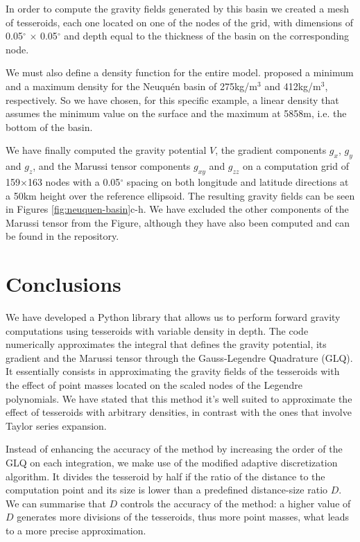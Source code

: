 \documentclass[extra]{gji}
\begin{document}
In order to compute the gravity fields generated by this basin we created a mesh of tesseroids, each one located on one of the nodes of the grid, with dimensions of 0.05$^\circ$ $\times$ 0.05$^\circ$ and depth equal to the thickness of the basin on the corresponding node.

We must also define a density function for the entire model.
\citet{Sigismondi2012} proposed a minimum and a maximum density for the Neuqu\'en basin of 275kg/m$^3$ and 412kg/m$^3$, respectively.
So we have chosen, for this specific example, a linear density that assumes the minimum value on the surface and the maximum at 5858m, i.e. the bottom of the basin.

We have finally computed the gravity potential $V$, the gradient components $g_x$, $g_y$ and $g_z$, and the Marussi tensor components $g_{xy}$ and $g_{zz}$ on a computation grid of 159$\times$163 nodes with a 0.05$^\circ$ spacing on both longitude and latitude directions at a 50km height over the reference ellipsoid.
The resulting gravity fields can be seen in Figures \ref{fig:neuquen-basin}c-h.
We have excluded the other components of the Marussi tensor from the Figure, although they have also been computed and can be found in the repository.



\section{Conclusions}

We have developed a Python library that allows us to perform forward gravity computations using tesseroids with variable density in depth.
The code numerically approximates the integral that defines the gravity potential, its gradient and the Marussi tensor through the Gauss-Legendre Quadrature (GLQ).
It essentially consists in approximating the gravity fields of the tesseroids with the effect of point masses located on the scaled nodes of the Legendre polynomials.
We have stated that this method it's well suited to approximate the effect of tesseroids with arbitrary densities, in contrast with the ones that involve Taylor series expansion.

Instead of enhancing the accuracy of the method by increasing the order of the GLQ on each integration, we make use of the modified adaptive discretization algorithm.
It divides the tesseroid by half if the ratio of the distance to the computation point and its size is lower than a predefined distance-size ratio $D$.
We can summarise that $D$ controls the accuracy of the method: a higher value of $D$ generates more divisions of the tesseroids, thus more point masses, what leads to a more precise approximation.
\end{document}

